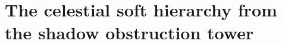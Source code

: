 %
%

\section{The celestial soft hierarchy from the shadow obstruction tower}
\label{ch:thqg-soft-graviton}%

\providecommand{\Sh}{\operatorname{Sh}}
\providecommand{\cA}{\mathcal{A}}
\providecommand{\cV}{\mathcal{V}}
\providecommand{\MC}{\text{MC}}
\providecommand{\gAmod}{\mathfrak{g}_{\cA}^{\mathrm{mod}}}
\providecommand{\Defcyc}{\operatorname{Def}_{\mathrm{cyc}}}
\providecommand{\dzero}{d_0}
\providecommand{\barBch}{\bar{B}^{\text{ch}}}
\providecommand{\Omegach}{\Omega^{\text{ch}}}
\providecommand{\dfib}{d_{\mathrm{fib}}}
\providecommand{\Ydg}{\mathcal{Y}^{\mathrm{dg}}}
\providecommand{\Gmod}{\mathcal{G}^{\mathrm{mod}}}
\providecommand{\Convstr}{\operatorname{Conv}_{\mathrm{str}}}
\providecommand{\Convinf}{\operatorname{Conv}_{\infty}}
\providecommand{\Definfmod}{\operatorname{Def}_{\infty}^{\mathrm{mod}}}
\providecommand{\Res}{\operatorname{Res}}
\providecommand{\Tr}{\operatorname{Tr}}
\providecommand{\ad}{\operatorname{ad}}
\providecommand{\id}{\mathrm{id}}
\providecommand{\rank}{\operatorname{rank}}
\providecommand{\wt}{\operatorname{wt}}
\providecommand{\Hom}{\operatorname{Hom}}
\providecommand{\End}{\operatorname{End}}
\providecommand{\Sym}{\operatorname{Sym}}
\providecommand{\Aut}{\operatorname{Aut}}
\providecommand{\sgn}{\operatorname{sgn}}
\providecommand{\Dg}[1]{D_{#1}}
\providecommand{\mcurv}[1]{m_0^{(#1)}}
\providecommand{\colldiv}[2]{D_{#1#2}}
\providecommand{\LogForm}[2]{\eta_{#1#2}}
\providecommand{\fg}{\mathfrak{g}}
\providecommand{\cW}{\mathcal{W}}

